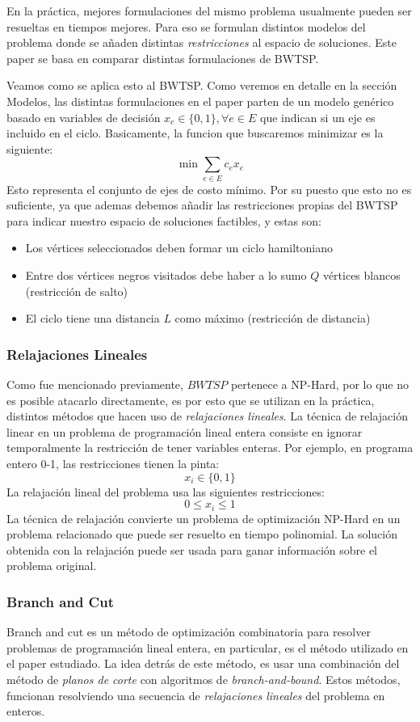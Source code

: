 \documentclass[10pt, a4paper]{article}
\theoremstyle{definition}
\begin{document}
En la práctica, mejores formulaciones del mismo problema usualmente pueden ser resueltas en tiempos mejores. Para eso se formulan distintos modelos del problema donde se añaden distintas \textit{restricciones} al espacio de soluciones. 
Este paper se basa en comparar distintas formulaciones de BWTSP.

Veamos como se aplica esto al BWTSP. Como veremos en detalle en la sección Modelos, las distintas formulaciones en el paper parten de un modelo genérico basado en variables de decisión $x_e \in \{0,1\}, \forall e \in E$ que indican si un eje es incluido en el ciclo.
Basicamente, la funcion que buscaremos minimizar es la siguiente:
$$\min \sum_{e \in E} c_{e} x_{e}$$
Esto representa el conjunto de ejes de costo mínimo. Por su puesto que esto no es suficiente, ya que ademas debemos añadir las restricciones propias del BWTSP para indicar nuestro espacio de soluciones factibles, y estas son:
\begin{itemize}
  \item Los vértices seleccionados deben formar un ciclo hamiltoniano
  \item Entre dos vértices negros visitados debe haber a lo sumo $Q$ vértices blancos (restricción de salto)
  \item El ciclo tiene una distancia $L$ como máximo (restricción de distancia)
\end{itemize} 

\subsubsection{Relajaciones Lineales}
Como fue mencionado previamente,  $BWTSP$ pertenece a NP-Hard, por lo que no es posible atacarlo directamente, es por esto que se utilizan en la práctica, distintos métodos que hacen uso de \textit{relajaciones lineales}.
La técnica de relajación linear en un problema de programación lineal entera consiste en ignorar temporalmente la restricción de tener variables enteras.
Por ejemplo, en programa entero 0-1, las restricciones tienen la pinta:
$$x_i \in \{0,1\}$$
La relajación lineal del problema usa las siguientes restricciones:
$$0 \leq x_i \leq 1$$
La técnica de relajación convierte un problema de optimización NP-Hard en un problema relacionado que puede ser resuelto en tiempo polinomial. La solución obtenida con la relajación puede ser usada para ganar información sobre el problema original. 


\subsubsection{Branch and Cut}
Branch and cut es un método de optimización combinatoria para resolver problemas de programación lineal entera, en particular, es el método utilizado en el paper estudiado.
La idea detrás de este método, es usar una combinación del método de \textit{planos de corte} con algoritmos de \textit{branch-and-bound}. Estos métodos, funcionan resolviendo una secuencia de \textit{relajaciones lineales} del problema en enteros.
\end{document}
